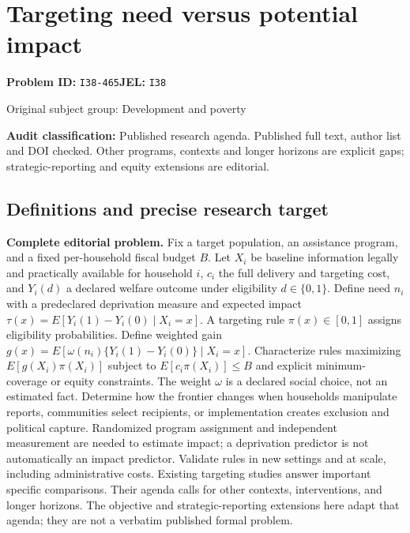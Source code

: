 \documentclass[11pt,a4paper]{article}
\begin{document}
\section*{Targeting need versus potential impact}
\textbf{Problem ID:} \texttt{I38-465}\quad \textbf{JEL:} \texttt{I38}\par
\label{problem:OP-0374}
{\sffamily\small\color{muted}Original subject group: Development and poverty\par}
\label{definitions:problem:30007656}
\textbf{Audit classification:} Published research agenda. Published full text, author list and DOI checked. Other programs, contexts and longer horizons are explicit gaps; strategic-reporting and equity extensions are editorial.
\subsection*{Definitions and precise research target}
\textbf{Complete editorial problem.} Fix a target population, an assistance program, and a fixed per-household fiscal budget \(B\). Let \(X_i\) be baseline information legally and practically available for household \(i\), \(c_i\) the full delivery and targeting cost, and \(Y_i(d)\) a declared welfare outcome under eligibility \(d\in\{0,1\}\). Define need \(n_i\) with a predeclared deprivation measure and expected impact \(\tau(x)=E[Y_i(1)-Y_i(0)\mid X_i=x]\). A targeting rule \(\pi(x)\in[0,1]\) assigns eligibility probabilities. Define weighted gain \(g(x)=E[\omega(n_i)\{Y_i(1)-Y_i(0)\}\mid X_i=x]\). Characterize rules maximizing \(E[g(X_i)\pi(X_i)]\) subject to \(E[c_i\pi(X_i)]\le B\) and explicit minimum-coverage or equity constraints. The weight \(\omega\) is a declared social choice, not an estimated fact. Determine how the frontier changes when households manipulate reports, communities select recipients, or implementation creates exclusion and political capture. Randomized program assignment and independent measurement are needed to estimate impact; a deprivation predictor is not automatically an impact predictor. Validate rules in new settings and at scale, including administrative costs. Existing targeting studies answer important specific comparisons. Their agenda calls for other contexts, interventions, and longer horizons. The objective and strategic-reporting extensions here adapt that agenda; they are not a verbatim published formal problem.
\end{document}
